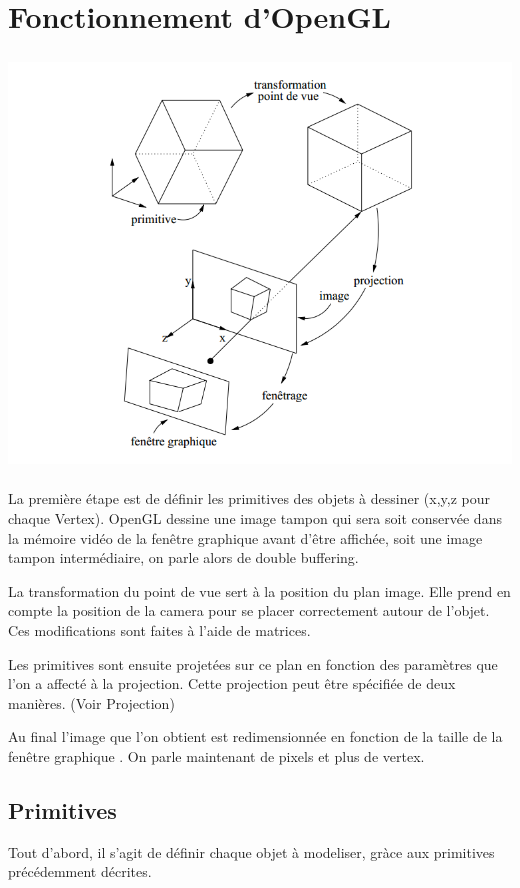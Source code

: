 \documentclass{report}
\begin{document}
\section{Fonctionnement d'OpenGL}
\begin{center}
	 \includegraphics[height=11cm]{img/Fonctionnement}
 \end{center}

La première étape est de définir les primitives des objets à dessiner (x,y,z pour chaque Vertex).
OpenGL dessine une image tampon qui sera soit conservée dans la mémoire vidéo de la fenêtre graphique avant d’être affichée, soit une image tampon intermédiaire, on parle alors de double buffering.

La transformation du point de vue sert à la position du plan image. Elle prend en compte la position de la camera pour se placer correctement autour de l'objet. Ces modifications sont faites à l'aide de matrices. 

Les primitives sont ensuite projetées sur ce plan en fonction des paramètres que l’on a affecté à la projection. Cette projection peut être spécifiée de deux manières. (Voir Projection)

Au final l’image que l’on obtient est redimensionnée en fonction de la taille de la fenêtre graphique . On parle maintenant de pixels et plus de vertex.
\newpage

\subsection{Primitives}
Tout d'abord, il s'agit de définir chaque objet à modeliser, gràce aux primitives précédemment décrites.
\end{document}
